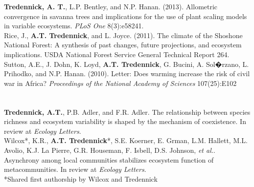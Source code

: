 \documentclass[margin,line]{resume}
\begin{document}
\begin{resume}
	\textbf{Tredennick, A. T.}, L.P. Bentley, and N.P. Hanan. (2013). Allometric convergence in savanna trees and implications for the use of plant scaling models in 	variable ecosystems. \textsl{PLoS One} 8(3):e58241. \vspace{-6mm}\\%

   Rice, J., \textbf{A.T. Tredennick}, and L. Joyce. (2011). The climate of the Shoshone National Forest: A synthesis of past changes, future projections, and 			ecosystem implications. USDA National Forest Service General Technical Report 264. \vspace{-6mm}\\%
	
	Sutton, A.E., J. Dohn, K. Loyd, \textbf{A.T. Tredennick}, G. Bucini, A. Sol�rzano, L. Prihodko, and N.P. Hanan. (2010). Letter: Does warming increase the risk of civil war 	in Africa? \textsl{Proceedings of the National Academy of Sciences} 107(25):E102 \\ 
		
	\section{\textmd{\textsf{}}}
	\textbf{Tredennick, A.T.}, P.B. Adler, and F.R. Adler. The relationship between species richness and ecosystem variability is shaped by the mechanism of coexistence. In review at \emph{Ecology Letters}. \vspace{-6mm}\\
	
	Wilcox*, K.R., \textbf{A.T. Tredennick}*, S.E. Koerner, E. Grman, L.M. Hallett, M.L. Avolio, K.J. La Pierre, G.R. Houseman, F. Isbell, D.S. Johnson, \emph{et al.}. Asynchrony among local communities stabilizes ecosystem function of metacommunities. In review at \emph{Ecology Letters}. \\%
    \hspace{2em} \textsf{\footnotesize{*Shared first authorship by Wilcox and Tredennick}}
	

\end{resume}
\end{document}
